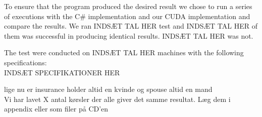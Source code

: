 To ensure that the program produced the desired result we chose to run a series of executions with the C\# implementation and our CUDA implementation and compare the results. We ran INDSÆT TAL HER test and INDSÆT TAL HER of them was successful in producing identical results. INDSÆT TAL HER was not. 

The test were conducted on INDSÆT TAL HER machines with the following specifications:\\
INDSÆT SPECIFIKATIONER HER


lige nu er insurance holder altid en kvinde og spouse altid en mand \\

Vi har lavet X antal kørsler der alle giver det samme resultat. Læg dem i appendix eller som filer på CD'en
